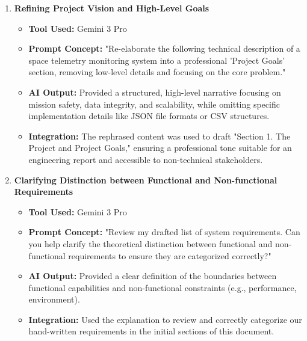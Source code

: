 \documentclass[11pt, a4paper]{article}
\begin{document}
\begin{enumerate}[label=\textbf{Topic \arabic*:}, align=left, leftmargin=0.5cm]

    \item \textbf{Refining Project Vision and High-Level Goals}
    \begin{itemize}[label={}, leftmargin=0.5cm]
        \item \textbf{Tool Used:} Gemini 3 Pro
        \item \textbf{Prompt Concept:} "Re-elaborate the following technical description of a space telemetry monitoring system into a professional 'Project Goals' section, removing low-level details and focusing on the core problem."
        \item \textbf{AI Output:} Provided a structured, high-level narrative focusing on mission safety, data integrity, and scalability, while omitting specific implementation details like JSON file formats or CSV structures.
        \item \textbf{Integration:} The rephrased content was used to draft "Section 1. The Project and Project Goals," ensuring a professional tone suitable for an engineering report and accessible to non-technical stakeholders.
    \end{itemize}
    \vspace{0.3cm}

    \item \textbf{Clarifying Distinction between Functional and Non-functional Requirements}
    \begin{itemize}[label={}, leftmargin=0.5cm]
        \item \textbf{Tool Used:} Gemini 3 Pro
        \item \textbf{Prompt Concept:} "Review my drafted list of system requirements. Can you help clarify the theoretical distinction between functional and non-functional requirements to ensure they are categorized correctly?"
        \item \textbf{AI Output:} Provided a clear definition of the boundaries between functional capabilities and non-functional constraints (e.g., performance, environment).
        \item \textbf{Integration:} Used the explanation to review and correctly categorize our hand-written requirements in the initial sections of this document.
    \end{itemize}
    \vspace{0.3cm}


\end{enumerate}
\end{document}
